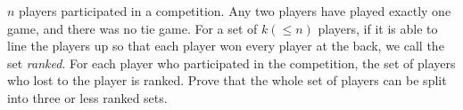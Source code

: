 $n$ players participated in a competition. Any two players have played exactly one game, and there was no tie game. For a set of $k(\le n)$ players, if it is able to line the players up so that each player won every player at the back, we call the set \textit{ranked}. For each player who participated in the competition, the set of players who lost to the player is ranked. Prove that the whole set of players can be split into three or less ranked sets.